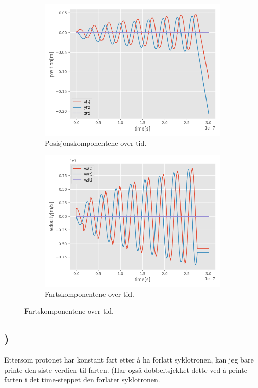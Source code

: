 \documentclass[report,12pt,norsk]{article}
\begin{document}
\begin{figure}[h!]
 \centering
 \begin{subfigure}{0.5\textwidth}
        	\centering 
        	\includegraphics[width=\textwidth]{cyclotron_2.png}
       	\caption{Posisjonskomponentene over tid.}
\end{subfigure}%
 \begin{subfigure}{0.5\textwidth}
        	\centering 
       	\includegraphics[width=\textwidth]{cyclotron_3.png}
        	\caption{Fartskomponentene over tid.}
\end{subfigure}
\end{figure}

\subsection{)}
Ettersom protonet har konstant fart etter å ha forlatt syklotronen, kan jeg bare printe den siste verdien til farten. (Har også dobbeltsjekket dette ved å printe farten i det time-steppet den forlater syklotronen. 
\end{document}
